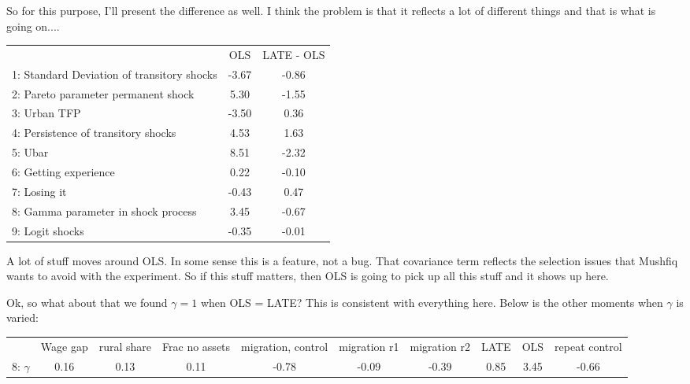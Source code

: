 \documentclass[pdftex,11pt]{article}
\renewcommand{\arraystretch}{.7}
\begin{document}
So for this purpose, I'll present the difference as well. I think the problem is that it reflects a lot of different things and that is what is going on.... \\

\begin{table}[!h]
\footnotesize
\setlength {\tabcolsep}{1.5mm}
\renewcommand{\arraystretch}{2.25}
\begin{center}\label{tb:ols-LATE}
\begin{tabular}{l c c}
\hline
\hline
& OLS & LATE - OLS \\
1: Standard Deviation of transitory shocks &   -3.67   &-0.86     \\
2: Pareto parameter permanent shock &           5.30   &-1.55     \\
3: Urban TFP &                                 -3.50   & 0.36     \\
4: Persistence of transitory shocks &            4.53  & 1.63     \\
5: Ubar &                                       8.51   &-2.32     \\
6: Getting experience &                          0.22  &-0.10     \\
7: Losing it &                                -0.43    & 0.47     \\
8: Gamma parameter in shock process &           3.45   &-0.67     \\
9: Logit shocks &                              -0.35   &-0.01     \\
\hline
\hline
\end{tabular}
\end{center}
\end{table}

A lot of stuff moves around OLS. In some sense this is a feature, not a bug. That covariance term reflects the selection issues that Mushfiq wants to avoid with the experiment. So if this stuff matters, then OLS is going to pick up all this stuff and it shows up here.

Ok, so what about that we found $\gamma = 1$ when OLS = LATE? This is consistent with everything here. Below is the other moments when $\gamma$ is varied:
\begin{table}[!h]
\footnotesize
\setlength {\tabcolsep}{1.5mm}
\renewcommand{\arraystretch}{2.25}
\begin{center}\label{tb:employment}
\begin{tabular}{l c c c c c c c c c }
\hline
\hline
           & Wage gap & rural share &  Frac no assets & migration, control &  migration r1 & migration r2 & LATE & OLS &  repeat control \\
8: $\gamma$  &  0.16  &  0.13   & 0.11  & -0.78  & -0.09 &  -0.39   & 0.85  &  3.45 & -0.66  \\

\hline
\hline
\end{tabular}
\end{center}
\end{table}
\end{document}
